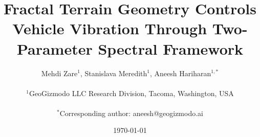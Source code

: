 \documentclass[11pt,letterpaper]{article}
\begin{document}
\title{\textbf{Fractal Terrain Geometry Controls Vehicle Vibration Through Two-Parameter Spectral Framework}}

\author{
Mehdi Zare$^{1}$, Stanislava Meredith$^{1}$, Aneesh Hariharan$^{1,*}$ \\
\\
$^{1}$GeoGizmodo LLC Research Division, Tacoma, Washington, USA \\
\\
$^{*}$Corresponding author: aneesh@geogizmodo.ai
}

\date{\today}

\maketitle

\begin{abstract}

\end{abstract}
\end{document}
